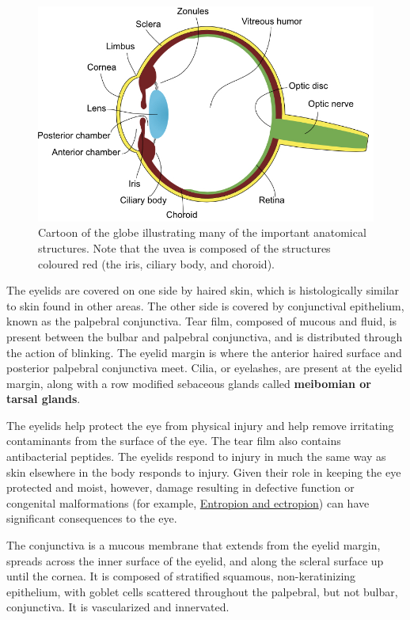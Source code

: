 \documentclass[
  openany]{article}
\begin{document}
\begin{figure}

{\centering \includegraphics[width=0.6\linewidth]{images/globe-labeled} 

}

\caption{Cartoon of the globe illustrating many of the important anatomical structures. Note that the uvea is composed of the structures coloured red (the iris, ciliary body, and choroid).}\label{fig:globe}
\end{figure}

The eyelids are covered on one side by haired skin, which is histologically similar to skin found in other areas. The other side is covered by conjunctival epithelium, known as the palpebral conjunctiva. Tear film, composed of mucous and fluid, is present between the bulbar and palpebral conjunctiva, and is distributed through the action of blinking. The eyelid margin is where the anterior haired surface and posterior palpebral conjunctiva meet. Cilia, or eyelashes, are present at the eyelid margin, along with a row modified sebaceous glands called \textbf{meibomian or tarsal glands}.

The eyelids help protect the eye from physical injury and help remove irritating contaminants from the surface of the eye. The tear film also contains antibacterial peptides. The eyelids respond to injury in much the same way as skin elsewhere in the body responds to injury. Given their role in keeping the eye protected and moist, however, damage resulting in defective function or congenital malformations (for example, \protect\hyperlink{entropion-and-ectropion}{Entropion and ectropion}) can have significant consequences to the eye.

The conjunctiva is a mucous membrane that extends from the eyelid margin, spreads across the inner surface of the eyelid, and along the scleral surface up until the cornea. It is composed of stratified squamous, non-keratinizing epithelium, with goblet cells scattered throughout the palpebral, but not bulbar, conjunctiva. It is vascularized and innervated.
\end{document}
